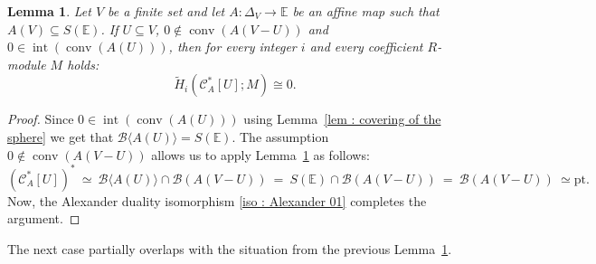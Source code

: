 \documentclass[a4paper,11pt,reqno, english]{amsart}
\newtheorem{lemma}[theorem]{Lemma}
\theoremstyle{definition}
\theoremstyle{remark}
\newcommand\CC{\mathscr C}
\newcommand\E{\mathbb{E}}
\newcommand\pt{\mathrm{pt}}
\DeclareMathOperator{\interior}{\mathrm{int}}
\DeclareMathOperator{\conv}{\mathrm{conv}}
\begin{document}
\medskip
\begin{lemma}
	\label{lem : topology of induced sub-complexes 04 }
	Let $V$ be a finite set and let $A\colon \Delta_V\longrightarrow\E$ be an affine map such that $A(V)\subseteq S(\E)$.
	If  $U\subseteq V$, $0\notin\conv(A(V-U))$ and $0\in\interior(\conv (A(U)))$, then for every integer $i$ and every coefficient $R$-module $M$ holds:
	\begin{equation}
		\label{eq : dual of dual 04}
		\widetilde{H}_i(\CC_A^*[U];M)\cong 0.
	\end{equation}
\end{lemma}
\begin{proof}
	Since $0\in\interior(\conv (A(U)))$ using Lemma~\ref{lem : covering of the sphere} we get that $\mathscr{B}\langle A(U)\rangle=S(\E)$.
	The assumption $0\notin\conv(A(V-U))$ allows us to apply Lemma~\ref{lem : topology of induced sub-complexes 04 } as follows:
	\[
		(\CC_A^*[U])^* \ \simeq \ \mathscr{B}\langle A(U)\rangle\cap \mathscr{B}(A(V-U)) \ =\ S(\E)\cap \mathscr{B}(A(V-U))\ =\ \mathscr{B}(A(V-U))\ \simeq \pt.
	\]
	Now, the Alexander duality isomorphism \eqref{iso : Alexander 01} completes the argument.
\end{proof}

\medskip
The next case partially overlaps with the situation from the previous Lemma~\ref{lem : topology of induced sub-complexes 04 }.
\end{document}
